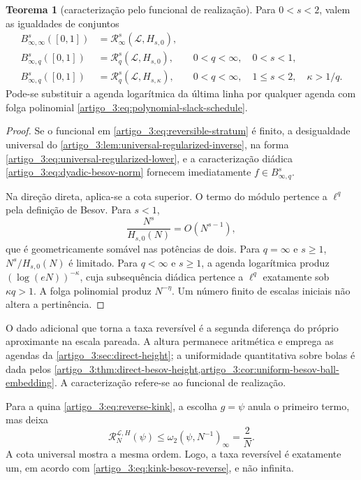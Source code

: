 \documentclass[12pt,a4paper]{article}
\theoremstyle{preciso}
\theoremstyle{definition}
\newcommand{\Library}{\mathcal{L}}
\theoremstyle{preciso}
\newtheorem{theorem}[teorema]{Teorema}
\theoremstyle{preciso}
\theoremstyle{preciso}
\theoremstyle{preciso}
\theoremstyle{definition}
\theoremstyle{preciso}
\theoremstyle{definition}
\theoremstyle{preciso}
\theoremstyle{preciso}
\theoremstyle{definition}
\begin{document}
\begin{theorem}[caracterização pelo funcional de realização]\label{map:artigo_3:5.13}
\label{artigo_3:thm:complete-besov-reversibility}
Para $0<s<2$, valem as igualdades de conjuntos
\begin{align}
 B^s_{\infty,\infty}([0,1])
 &=\mathscr R_\infty^s(\Library,H_{s,0}),
 \label{artigo_3:eq:complete-reverse-endpoint}\\
 B^s_{\infty,q}([0,1])
 &=\mathscr R_q^s(\Library,H_{s,0}),
 &&0<q<\infty,\quad0<s<1,
 \label{artigo_3:eq:complete-reverse-subcritical}\\
 B^s_{\infty,q}([0,1])
 &=\mathscr R_q^s(\Library,H_{s,\kappa}),
 &&0<q<\infty,\quad1\le s<2,\quad\kappa>1/q.
 \label{artigo_3:eq:complete-reverse-critical}
\end{align}
Pode-se substituir a agenda logarítmica da última linha por qualquer agenda
com folga polinomial \eqref{artigo_3:eq:polynomial-slack-schedule}.
\end{theorem}

\begin{proof}
Se o funcional em \eqref{artigo_3:eq:reversible-stratum} é finito, a desigualdade
universal do \cref{artigo_3:lem:universal-regularized-inverse}, na forma
\eqref{artigo_3:eq:universal-regularized-lower}, e a caracterização diádica
\eqref{artigo_3:eq:dyadic-besov-norm} fornecem imediatamente
$f\in B^s_{\infty,q}$.

Na direção direta, aplica-se a cota superior. O termo do módulo pertence a
$\ell^q$ pela definição de Besov. Para $s<1$,
\[
 \frac{N^s}{H_{s,0}(N)}=O(N^{s-1}),
\]
que é geometricamente somável nas potências de dois. Para $q=\infty$ e
$s\ge1$, $N^s/H_{s,0}(N)$ é limitado. Para $q<\infty$ e $s\ge1$, a agenda
logarítmica produz $(\log(eN))^{-\kappa}$, cuja subsequência diádica pertence
a $\ell^q$ exatamente sob $\kappa q>1$. A folga polinomial produz
$N^{-\eta}$. Um número finito de escalas iniciais não altera a pertinência.
\end{proof}

O dado adicional que torna a taxa reversível é a segunda diferença do próprio
aproximante na escala pareada. A altura permanece aritmética e emprega as agendas
da \cref{artigo_3:sec:direct-height}; a uniformidade quantitativa sobre bolas é dada
pelos \cref{artigo_3:thm:direct-besov-height,artigo_3:cor:uniform-besov-ball-embedding}. A caracterização refere-se ao funcional de realização.

Para a quina \eqref{artigo_3:eq:reverse-kink}, a escolha $g=\psi$ anula o primeiro termo,
mas deixa
\begin{equation}
 \mathcal R_N^{\Library,H}(\psi)
 \le\omega_2(\psi,N^{-1})_\infty=\frac2N.
 \label{artigo_3:eq:kink-regularized-rate}
\end{equation}
A cota universal mostra a mesma ordem. Logo, a taxa reversível é exatamente
um, em acordo com \eqref{artigo_3:eq:kink-besov-reverse}, e não infinita.
\end{document}
